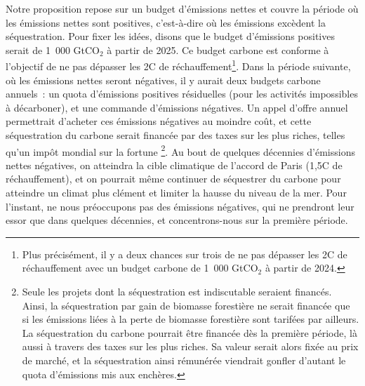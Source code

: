 \documentclass[a5paper,french]{memoir}
\begin{document}
Notre proposition repose sur un budget d'émissions nettes et couvre la période où les émissions nettes sont positives, c'est-à-dire où les émissions excèdent la séquestration. Pour fixer les idées, disons que le budget d'émissions positives serait de 1~000 GtCO$_\text{2}$ à partir de 2025. Ce budget carbone est conforme à l'objectif de ne pas dépasser les 2\textdegree{}C de réchauffement\footnote{Plus précisément, il y a deux chances sur trois de ne pas dépasser les 2\textdegree{}C de réchauffement avec un budget carbone de 1~000 GtCO$_\text{2}$ à partir de 2024.}. Dans la période suivante, où les émissions nettes seront négatives, il y aurait deux budgets carbone annuels~: un quota d'émissions positives résiduelles (pour les activités impossibles à décarboner), et une commande d'émissions négatives. Un appel d'offre annuel permettrait d'acheter ces émissions négatives au moindre coût, et cette séquestration du carbone serait financée par des taxes sur les plus riches, telles qu'un impôt mondial sur la fortune
\footnote{Seule les projets dont la séquestration est indiscutable seraient financés. Ainsi, la séquestration par gain de biomasse forestière ne serait financée que si les émissions liées à la perte de biomasse forestière sont tarifées par ailleurs. La séquestration du carbone pourrait être financée dès la première période, là aussi à travers des taxes sur les plus riches. Sa valeur serait alors fixée au prix de marché, et la séquestration ainsi rémunérée viendrait gonfler d'autant le quota d'émissions mis aux enchères.}. %
Au bout de quelques décennies d'émissions nettes négatives, on atteindra la cible climatique de l'accord de Paris (1,5\textdegree{}C de réchauffement), et on pourrait même continuer de séquestrer du carbone pour atteindre un climat plus clément et limiter la hausse du niveau de la mer. Pour l'instant, ne nous préoccupons pas des émissions négatives, qui ne prendront leur essor que dans quelques décennies, et concentrons-nous sur la première période. 
\end{document}
